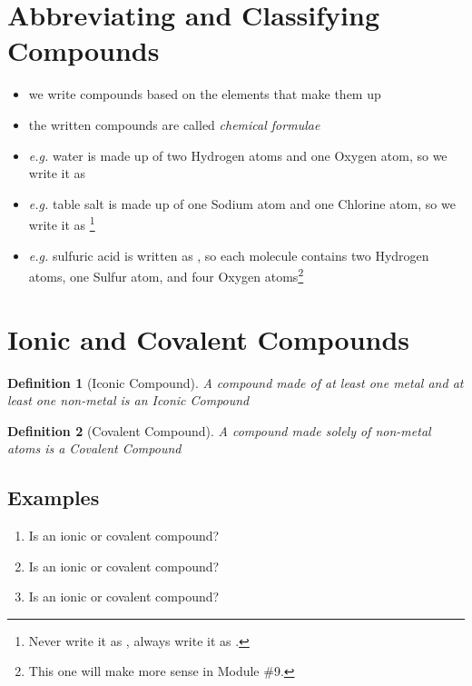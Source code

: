 \documentclass[11pt, oneside]{article}   	%
\newtheorem{definition}{Definition}
\begin{document}
\section{Abbreviating and Classifying Compounds}
\begin{itemize}
\item we write compounds based on the elements that make them up
\item the written compounds are called \emph{chemical formulae}
\item \emph{e.g.} water is made up of two Hydrogen atoms and one Oxygen atom, so we write it as 
\item \emph{e.g.} table salt is made up of one Sodium atom and one Chlorine atom, so we write it as \footnote{Never write it as , always write it as .}
\item \emph{e.g.} sulfuric acid is written as , so each molecule contains two Hydrogen atoms, one Sulfur atom, and four Oxygen atoms\footnote{This one will make more sense in Module \#9.}
\end{itemize}


\section{Ionic and Covalent Compounds}
\begin{definition}[Iconic Compound]
A compound made of at least one metal and at least one non-metal is an \emph{Iconic Compound}
\end{definition}

\begin{definition}[Covalent Compound]
A compound made solely of non-metal atoms is a \emph{Covalent Compound}
\end{definition}

\subsection{Examples}
\begin{enumerate}[label=Example \arabic*]
\item Is  an ionic or covalent compound?
\item Is  an ionic or covalent compound?
\item Is  an ionic or covalent compound?
 \end{enumerate}
\end{document}
